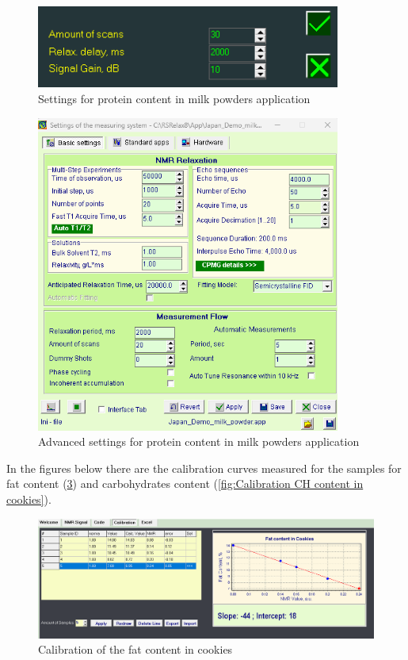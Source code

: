 \documentclass[a4paper,12pt]{article}
\begin{document}
\begin{figure}[H]
\centering
\includegraphics[width=10cm]{Gui_Cookie_Fat.png}
\caption{Settings for protein content in milk powders application}
\label{fig:Gui Settings for protein content in cookie application}
\end{figure}

\begin{figure}[H]
\centering
\includegraphics[width=10cm]{Settings_Milk_Fat.png}
\caption{Advanced settings for protein content in milk powders application}
\label{fig:Settings for protein content in cookie application}
\end{figure}

In the figures below there are the calibration curves measured for the samples for fat content (\cref{fig:Calibration fat content in cookies}) and carbohydrates content (\cref{fig:Calibration CH content in cookies}).

\begin{figure}[H]
\centering
\includegraphics[width=17cm]{Calibration_Cook_Fat.png}
\caption{Calibration of the fat content in cookies}
\label{fig:Calibration fat content in cookies}
\end{figure}
\end{document}
